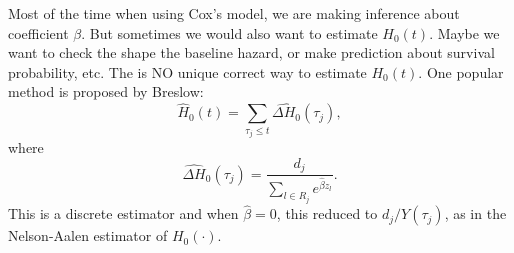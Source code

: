 \documentclass[a4paper,12pt]{article}
\begin{document}
Most of the time when using Cox's model, we are making inference about coefficient $\beta$. But sometimes we would also want to estimate $H_0\left(t\right)$. Maybe we want to check the shape the baseline hazard, or make prediction about survival probability, etc. The is NO unique correct way to estimate $H_0\left(t\right)$. One popular method is proposed by Breslow:
\[
  \widehat{H}_0\left(t\right)
  = \sum\limits_{\tau_j \leq t}
  \widehat{\Delta H_0}\left(\tau_j\right)
  ,
\]
where
\[
  \widehat{\Delta H}_0\left(\tau_j\right)
  = \frac{d_j}{\sum\limits_{l\in R_j}e^{\hat{\beta}z_l}}
  .
\]
This is a discrete estimator and when $\hat{\beta} = 0$, this reduced to $d_j/Y\left(\tau_j\right)$, as in the Nelson-Aalen estimator of $H_0\left(\cdot\right)$.





\end{document}
